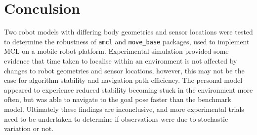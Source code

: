 \documentclass[a4paper]{article}
\begin{document}
\begin{minipage}{0.45\textwidth}
\centering
{}
\end{minipage}
\hspace{1cm}
\begin{minipage}{0.45\textwidth}
\centering
{}
\end{minipage}


\section{Conculsion}
Two robot models with differing body geometries and sensor locations were tested to determine the robustness of \texttt{amcl} and \texttt{move\_base} packages, used to implement MCL on a mobile robot platform. Experimental simulation provided some evidence that time taken to localise within an environment is not affected by changes to robot geometries and sensor locations, however, this may not be the case for algorithm stability and navigation path efficiency. The personal model appeared to experience reduced stability becoming stuck in the environment more often, but was able to navigate to the goal pose faster than the benchmark model. Ultimately these findings are inconclusive, and more experimental trials need to be undertaken to determine if observations were due to stochastic variation or not.




\end{document}
